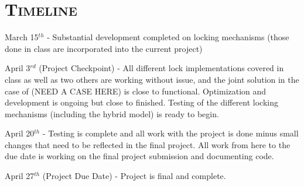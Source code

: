 \documentclass[finalProject.tex]{subfiles}
\begin{document}
\bigskip

\section*{\textsc{\Large Timeline}}

March 15$^{th}$ - Substantial development completed on locking mechanisms (those done in class are incorporated into the current project)

April 3$^{rd}$ (Project Checkpoint) - All different lock implementations covered in class as well as two others are working without issue, and the joint solution in the case of (NEED A CASE HERE) is close to functional. Optimization and development is ongoing but close to finished. Testing of the different locking mechanisms (including the hybrid model) is ready to begin.

April 20$^{th}$ - Testing is complete and all work with the project is done minus small changes that need to be reflected in the final project. All work from here to the due date is working on the final project submission and documenting code. 

April 27$^{th}$ (Project Due Date) - Project is final and complete.
\end{document}
